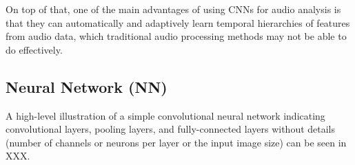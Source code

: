 On top of that, one of the main advantages of using CNNs for audio analysis is that they can automatically and adaptively learn temporal hierarchies of features from audio data, which traditional audio processing methods may not be able to do effectively. 

\subsection{Neural Network (NN)}






A high-level illustration of a simple convolutional neural network indicating convolutional layers, pooling layers, and fully-connected layers without details (number of channels or neurons per layer or the input image size) can be seen in XXX.








\newpage


